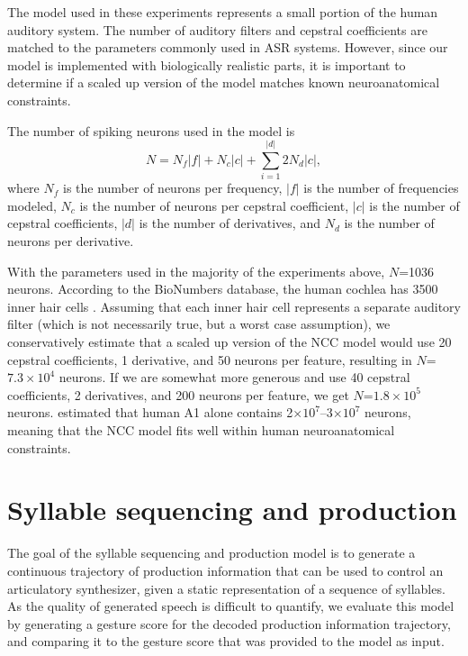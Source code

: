 The model used in these experiments
represents a small portion
of the human auditory system.
The number of auditory filters
and cepstral coefficients
are matched to the parameters
commonly used in ASR systems.
However, since our model is
implemented with biologically realistic parts,
it is important to determine
if a scaled up version of the model
matches known neuroanatomical constraints.

The number of spiking neurons used
in the model is
\begin{equation*}
  N = N_f |f| + N_c |c| + \sum_{i=1}^{|d|} 2 N_d |c|,
\end{equation*}
where $N_f$ is the number of neurons per frequency,
$|f|$ is the number of frequencies modeled,
$N_c$ is the number of neurons per cepstral coefficient,
$|c|$ is the number of cepstral coefficients,
$|d|$ is the number of derivatives,
and $N_d$ is the number of neurons per derivative.

With the parameters used
in the majority of the experiments above,
$N$=1036 neurons.
According to the BioNumbers database,
the human cochlea has 3500 inner hair cells
\citep[BNID~100697]{milo2010}.
Assuming that each inner hair cell
represents a separate auditory filter
(which is not necessarily true,
but a worst case assumption),
we conservatively estimate
that a scaled up version
of the NCC model
would use 20 cepstral coefficients,
1 derivative, and 50 neurons per feature,
resulting in $N$=$7.3 \times 10^4$ neurons.
If we are somewhat more generous
and use 40 cepstral coefficients,
2 derivatives, and 200 neurons per feature,
we get $N$=$1.8 \times 10^5$ neurons.
\citet{smiley2013} estimated
that human A1 alone contains
2$\times 10^7$--3$\times 10^7$ neurons,
meaning that the NCC model
fits well within human neuroanatomical constraints.

\section{Syllable sequencing and production}
\label{sec:results-production}

The goal of the syllable sequencing and production model
is to generate a continuous trajectory
of production information
that can be used to control
an articulatory synthesizer,
given a static representation
of a sequence of syllables.
As the quality of generated speech
is difficult to quantify,
we evaluate this model
by generating a gesture score
for the decoded production information trajectory,
and comparing it
to the gesture score that was provided
to the model as input.

